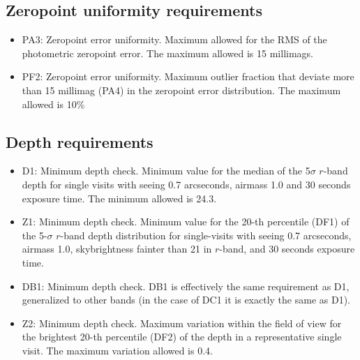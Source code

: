 \documentclass[a4paper,fleqn,usenatbib]{mnras}
\begin{document}
\subsection{Zeropoint uniformity requirements}
\begin{itemize}
\item PA3: Zeropoint error uniformity. Maximum allowed for the RMS of the photometric zeropoint error. The maximum allowed is 15 millimags.
\item PF2: Zeropoint error uniformity. Maximum outlier fraction that deviate more than 15 millimag (PA4) in the zeropoint error distribution. The maximum allowed is 10\%
\end{itemize}

\subsection{Depth requirements}
\begin{itemize}
\item D1: Minimum depth check. Minimum value for the median of the 5$\sigma$ $r$-band depth for single visits with seeing 0.7 arcseconds, airmass 1.0 and 30 seconds exposure time. The minimum allowed is 24.3.
\item Z1: Minimum depth check. Minimum value for the 20-th percentile (DF1) of the 5-$\sigma$ $r$-band depth distribution for single-visits with seeing 0.7 arcseconds, airmass 1.0, skybrightness fainter than 21 in $r$-band, and 30 seconds exposure time.
\item DB1: Minimum depth check. DB1 is effectively the same requirement as D1, generalized to other bands (in the case of DC1 it is exactly the same as D1).
\item Z2: Minimum depth check. Maximum variation within the field of view for the brightest 20-th percentile (DF2) of the depth in a representative single visit. The maximum variation allowed is 0.4.
\end{itemize}
\end{document}
